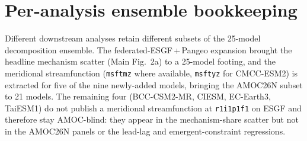 \documentclass[10pt,a4paper]{article}
\begin{document}
\section*{Per-analysis ensemble bookkeeping}
\label{si:ensemble}

Different downstream analyses retain different subsets of the 25-model
decomposition ensemble. The federated-ESGF\,+\,Pangeo expansion brought
the headline mechanism scatter (Main Fig.~2a) to a 25-model footing,
and the meridional streamfunction (\texttt{msftmz} where available,
\texttt{msftyz} for CMCC-ESM2) is extracted for five of the nine
newly-added models, bringing the AMOC26N subset to 21 models. The
remaining four (BCC-CSM2-MR, CIESM, EC-Earth3, TaiESM1) do not
publish a meridional streamfunction at \texttt{r1i1p1f1} on ESGF
and therefore stay AMOC-blind: they appear in the mechanism-share
scatter but not in the AMOC26N panels or the lead-lag and
emergent-constraint regressions.
\end{document}
